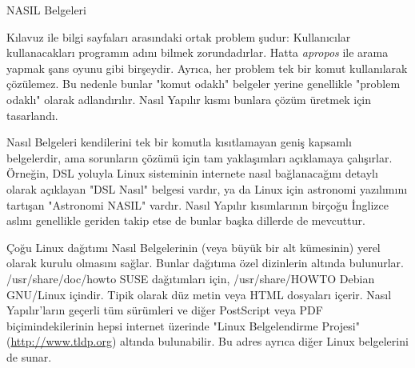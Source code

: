 \begin{section}{NASIL Belgeleri}

Kılavuz ile bilgi sayfaları arasındaki ortak problem şudur: Kullanıcılar kullanacakları programın adını bilmek zorundadırlar. Hatta \emph{apropos} ile arama yapmak şans oyunu gibi birşeydir. Ayrıca, her problem tek bir komut kullanılarak çözülemez. Bu nedenle bunlar "komut odaklı" belgeler yerine genellikle "problem odaklı" olarak adlandırılır. Nasıl Yapılır kısmı bunlara çözüm üretmek için tasarlandı.

Nasıl Belgeleri kendilerini tek bir komutla  kısıtlamayan geniş kapsamlı belgelerdir, ama sorunların çözümü için tam yaklaşımları açıklamaya çalışırlar. Örneğin, DSL yoluyla Linux sisteminin internete nasıl bağlanacağını detaylı olarak açıklayan "DSL Nasıl" belgesi vardır, ya da Linux için astronomi yazılımını tartışan "Astronomi NASIL" vardır. Nasıl Yapılır kısımlarının birçoğu İnglizce aslını genellikle geriden takip etse de bunlar başka dillerde de mevcuttur.

Çoğu Linux dağıtımı Nasıl Belgelerinin (veya büyük bir alt kümesinin) yerel olarak kurulu olmasını sağlar. Bunlar dağıtıma özel dizinlerin altında bulunurlar. /usr/share/doc/howto SUSE dağıtımları için, /usr/share/HOWTO Debian GNU/Linux içindir. Tipik olarak düz metin veya HTML dosyaları içerir. Nasıl Yapılır'ların geçerli tüm sürümleri ve diğer PostScript veya PDF biçimindekilerinin hepsi internet üzerinde "Linux Belgelendirme Projesi" (\url{http://www.tldp.org}) altında bulunabilir. Bu adres ayrıca diğer Linux belgelerini de sunar.
\end{section}
